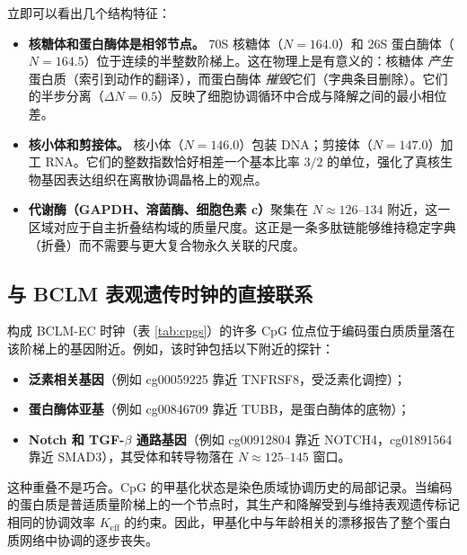 \documentclass[12pt,a4paper,fontset=fandol]{ctexart}
\begin{document}
	立即可以看出几个结构特征：
	\begin{itemize}
		\item \textbf{核糖体和蛋白酶体是相邻节点。} 70S 核糖体（\(N=164.0\)）和 26S 蛋白酶体（\(N=164.5\)）位于连续的半整数阶梯上。这在物理上是有意义的：核糖体 \emph{产生}蛋白质（索引到动作的翻译），而蛋白酶体 \emph{摧毁}它们（字典条目删除）。它们的半步分离（\(\Delta N = 0.5\)）反映了细胞协调循环中合成与降解之间的最小相位差。
		\item \textbf{核小体和剪接体。} 核小体（\(N=146.0\)）包装 DNA；剪接体（\(N=147.0\)）加工 RNA。它们的整数指数恰好相差一个基本比率 \(3/2\) 的单位，强化了真核生物基因表达组织在离散协调晶格上的观点。
		\item \textbf{代谢酶（GAPDH、溶菌酶、细胞色素 c）}聚集在 \(N \approx 126\)--\(134\) 附近，这一区域对应于自主折叠结构域的质量尺度。这正是一条多肽链能够维持稳定字典（折叠）而不需要与更大复合物永久关联的尺度。
	\end{itemize}
	
	\subsection{与 BCLM 表观遗传时钟的直接联系}
	
	构成 BCLM-EC 时钟（表 \ref{tab:cpgs}）的许多 CpG 位点位于编码蛋白质质量落在该阶梯上的基因附近。例如，该时钟包括以下附近的探针：
	\begin{itemize}
		\item \textbf{泛素相关基因}（例如 cg00059225 靠近 TNFRSF8，受泛素化调控）；
		\item \textbf{蛋白酶体亚基}（例如 cg00846709 靠近 TUBB，是蛋白酶体的底物）；
		\item \textbf{Notch 和 TGF-\(\beta\) 通路基因}（例如 cg00912804 靠近 NOTCH4，cg01891564 靠近 SMAD3），其受体和转导物落在 \(N \approx 125\)--\(145\) 窗口。
	\end{itemize}
	
	这种重叠不是巧合。CpG 的甲基化状态是染色质域协调历史的局部记录。当编码的蛋白质是普适质量阶梯上的一个节点时，其生产和降解受到与维持表观遗传标记相同的协调效率 \(K_{\mathrm{eff}}\) 的约束。因此，甲基化中与年龄相关的漂移报告了整个蛋白质网络中协调的逐步丧失。
	
\end{document}
